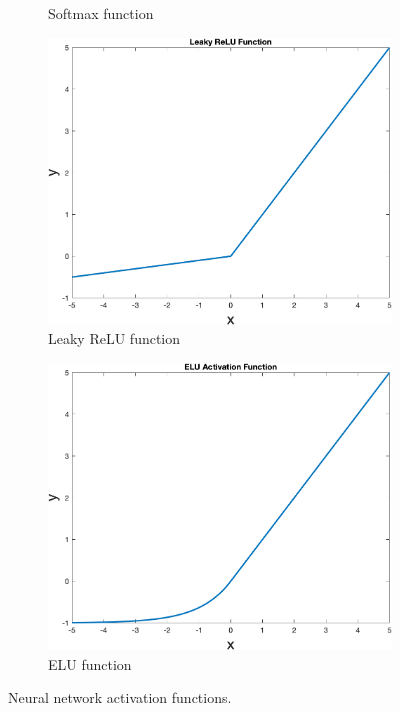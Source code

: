 \begin{figure}
\begin{subfigure}[b]{0.4\textwidth}
            \caption{Softmax function}
            \label{fig:sigmsoftmaxoid}
        \end{subfigure}
        \begin{subfigure}[b]{0.4\textwidth}
            \includegraphics[width=\textwidth]{figures/leakyrelu}
            \caption{Leaky ReLU function}
            \label{fig:leakyrelu}
        \end{subfigure}
        \hspace{0.1\textwidth}
        \begin{subfigure}[b]{0.4\textwidth}
            \includegraphics[width=\textwidth]{figures/elu}
            \caption{ELU function}
            \label{fig:elu}
        \end{subfigure}
        \caption{Neural network activation functions.}
        \label{fig:activationfunctions}
    \end{figure}

